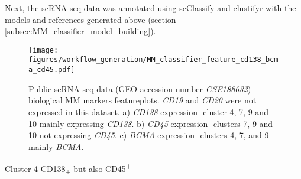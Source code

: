Next, the scRNA-seq data was annotated using scClassify and clustifyr with the models and references generated above (section \ref{subsec:MM_classifier_model_building}).

\begin{figure}[htb]
\centering
\texttt{[image: figures/workflow\_generation/MM\_classifier\_feature\_cd138\_bcma\_cd45.pdf]}
\caption[Public scRNA-seq data bioligical MM markers featureplots]{Public scRNA-seq data (GEO accession number \textit{GSE188632}) biological MM markers featureplots.
\textit{CD19} and \textit{CD20} were not expressed in this dataset.
a) \textit{CD138} expression- cluster 4, 7, 9 and 10 mainly expressing \textit{CD138}.
b) \textit{CD45} expression- clusters 7, 9 and 10 not expressing \textit{CD45}.
c) \textit{BCMA} expression- clusters 4, 7, and 9 mainly \textit{BCMA}.
}
\label{fig:mm_class_ftp_cd138_cd45_bcma}
\end{figure}
%

Cluster 4 CD138\textsubscript{+} but also CD45\textsuperscript{+}